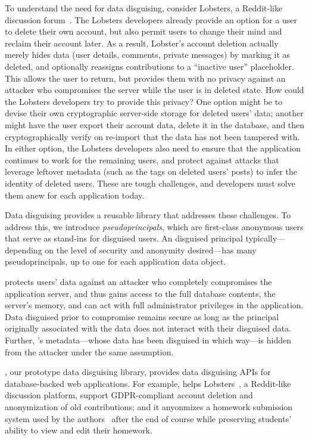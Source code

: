 %
To understand the need for data disguising, consider Lobsters, a Reddit-like
discussion forum~\cite{lobsters}.
%
The Lobsters developers already provide an option for a user to delete their own
account, but also permit users to change their mind and reclaim their
account later.
%
As a result, Lobster's account deletion actually merely hides data (\eg user
details, comments, private messages) by marking it as deleted, and optionally
reassigns contributions to a ``inactive user'' placeholder.
%
This allows the user to return, but provides them with no privacy against an
attacker who compromises the server while the user is in deleted state.
%
How could the Lobsters developers try to provide this privacy?
%
One option might be to devise their own cryptographic server-side storage for
deleted users' data; another might have the user export their account data,
delete it in the database, and then cryptographically verify on re-import that
the data has not been tampered with.
%
In either option, the Lobsters developers also need to ensure that the
application continues to work for the remaining users, and protect against
attacks that leverage leftover metadata (such as the tags on deleted users'
posts) to infer the identity of deleted users.
%
These are tough challenges, and developers must solve them anew for each
application today.
%

%
Data disguising provides a reusable library that addresses these challenges.
%
%
To address this, we introduce \emph{pseudoprincipals}, which are first-class anonymous
users that serve as stand-ins for disguised users.
%
An disguised principal typically---depending on the level of security and anonymity
desired---has many pseudoprincipals, up to one for each application data object.
%

%
\sys protects users' data against an attacker who completely compromises the
application server, and thus gains access to the full database contents, the server's
memory, and can act with full administrator privileges in the application.
%
Data disguised prior to compromise remains secure as long as the principal
originally associated with the data does not interact with their disguised
data.
%
Further, \sys's metadata---\eg whose data has been disguised in which way---is
hidden from the attacker under the same assumption.
%


%
\sys, our prototype data disguising library, provides data disguising APIs for
database-backed web applications.
%
For example, \sys helps Lobsters~\cite{lobsters}, a Reddit-like discussion platform,
support GDPR-compliant account deletion and anonymization of old contributions; and it
anyonmizes a homework submission system used by the authors~\cite{websubmit-rs-anon}
after the end of course while preserving students' ability to view and edit their
homework.
%


